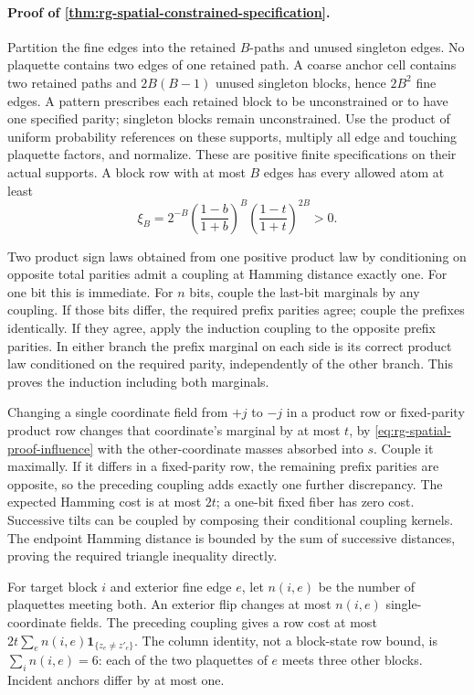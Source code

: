 \paragraph{Proof of \cref{thm:rg-spatial-constrained-specification}.}
Partition the fine edges into the retained \(B\)-paths and unused singleton
edges. No plaquette contains two edges of one retained path. A coarse
anchor cell contains two retained paths and \(2B(B-1)\) unused singleton
blocks, hence \(2B^2\) fine edges. A pattern prescribes each retained block
to be unconstrained or to have one specified parity; singleton blocks
remain unconstrained. Use the product of uniform probability references on
these supports, multiply all edge and touching plaquette factors, and
normalize. These are positive finite specifications on their actual
supports. A block row with at most \(B\) edges has every allowed atom at
least
\begin{equation}
 \xi_B=2^{-B}\left(\frac{1-b}{1+b}\right)^B
                   \left(\frac{1-t}{1+t}\right)^{2B}>0.
 \label{eq:rg-spatial-proof-block-positivity}
\end{equation}

Two product sign laws obtained from one positive product law by conditioning
on opposite total parities admit a coupling at Hamming distance exactly
one. For one bit this is immediate. For \(n\) bits, couple the last-bit
marginals by any coupling. If those bits differ, the required prefix
parities agree; couple the prefixes identically. If they agree, apply the
induction coupling to the opposite prefix parities. In either branch the
prefix marginal on each side is its correct product law conditioned on the
required parity, independently of the other branch. This proves the
induction including both marginals.

Changing a single coordinate field from \(+j\) to \(-j\) in a product row
or fixed-parity product row changes that coordinate's marginal by at most
\(t\), by \cref{eq:rg-spatial-proof-influence} with the other-coordinate
masses absorbed into \(s\). Couple it maximally. If it differs in a
fixed-parity row, the remaining prefix parities are opposite, so the
preceding coupling adds exactly one further discrepancy. The expected
Hamming cost is at most \(2t\); a one-bit fixed fiber has zero cost.
Successive tilts can be coupled by composing their conditional coupling
kernels. The endpoint Hamming distance is bounded by the sum of successive
distances, proving the required triangle inequality directly.

For target block \(i\) and exterior fine edge \(e\), let \(n(i,e)\) be
the number of plaquettes meeting both. An exterior flip changes at most
\(n(i,e)\) single-coordinate fields. The preceding coupling gives a row
cost at most \(2t\sum_e n(i,e)\mathbf1_{\{z_e\ne z'_e\}}\).
The column identity, not a block-state row bound, is
\(\sum_i n(i,e)=6\): each of the two plaquettes of \(e\) meets three other
blocks. Incident anchors differ by at most one.


